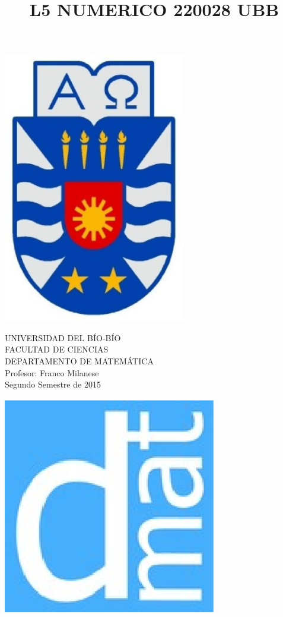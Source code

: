 \documentclass[11pt]{article}
\begin{document}
\title{L5 NUMERICO 220028 UBB}

{\begin{minipage}{2cm}
\hspace*{1cm}\includegraphics[width=0.6\textwidth]{escubo-ubb.eps}
\end{minipage}
\begin{minipage}{12cm}
\small
{\bf \rm 
{
\begin{center}
{\footnotesize UNIVERSIDAD DEL B\'IO-B\'IO} \\
{\scriptsize FACULTAD DE CIENCIAS}  \\
{\scriptsize DEPARTAMENTO DE MATEM\'ATICA}  \\
{\scriptsize Profesor:  Franco Milanese}\\
{\scriptsize Segundo Semestre de 2015}
\end{center}
}}
\end{minipage}}
{\begin{minipage}{2cm}
\hspace*{-0.5cm}\vspace*{-0.05cm}\includegraphics[width=0.7\textwidth]{escudo-dmat.eps}
\end{minipage}}
\end{document}

